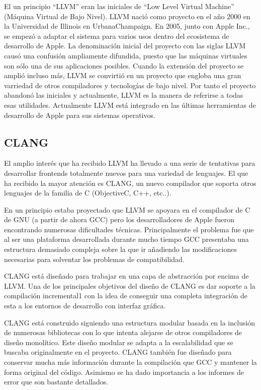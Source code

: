 El un principio ``LLVM'' eran las iniciales de ``Low Level Virtual Machine'' (Máquina Virtual de Bajo Nivel). LLVM nació como proyecto en el año 2000 en la Universidad de Illinois en UrbanaChampaign. En 2005, junto con Apple Inc., se empezó a adaptar el sistema para varios usos dentro del ecosistema de desarrollo de Apple. La denominación inicial del proyecto con las siglas LLVM causó una confusión ampliamente difundida, puesto que las máquinas virtuales son sólo una de sus aplicaciones posibles. Cuando la extensión del proyecto se amplió incluso más, LLVM se convirtió en un proyecto que engloba una gran varriedad de otros compiladores y tecnologías de bajo nivel. Por tanto el proyecto abandonó las iniciales y actualmente, LLVM es la manera de referirse a todas esas utilidades. Actualmente LLVM está integrado en las últimas herramientas de desarrollo de Apple para sus sistemas operativos.

\subsection{CLANG}

El amplio interés que ha recibido LLVM ha llevado a una serie de tentativas para desarrollar frontends totalmente nuevos para una variedad de lenguajes. El que ha recibido la mayor atención es CLANG, un nuevo compilador que soporta otros lenguajes de la familia de C (ObjectiveC, C++, etc..).

En un principio estaba proyectado que LLVM se apoyara en el compilador de C de GNU (a partir de ahora GCC) pero los desarrolladores de Apple fueron encontrando numerosas dificultades técnicas. Principalmente el problema fue que al ser una plataforma desarrollada durante mucho tiempo GCC presentaba una estructura demasiado compleja sobre la que ir añadiendo las modificaciones necesarias para solventar los problemas de compatibilidad.

CLANG está diseñado para trabajar en una capa de abstracción por encima de LLVM. Una de los principales objetivos del diseño de CLANG es dar soporte a la compilación incremental1 con la idea de conseguir una completa integración de esta a los entornos de desarrollo con interfaz gráfica.

CLANG está construido siguiendo una estructura modular basada en la inclusión de numerosas bibliotecas con lo que intenta alejarse de otros compiladores de diseño monolítico. Este diseño modular se adapta a la escalabilidad que se buscaba originalmente en el proyecto. CLANG también fue diseñado para conservar mucha más información durante la compilación que GCC y mantener la forma original del código. Asimismo se ha dado importancia a los informes de error que son bastante detallados.

